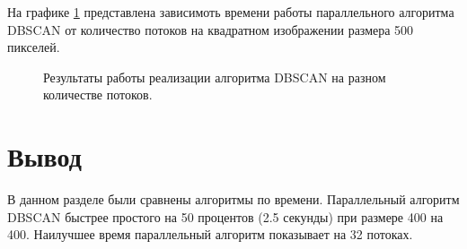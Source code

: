 На графике \ref{graph:j} представлена зависимоть времени работы параллельного алгоритма DBSCAN от количество потоков на квадратном изображении размера 500 пикселей.

\begin{figure}[ht!]
	\begin{center}
		\captionsetup{singlelinecheck = false, justification=centerfirst}
		\centering
		\caption{Результаты работы реализации алгоритма DBSCAN на разном количестве потоков.}
		\label{graph:j}
	\end{center}
	
\end{figure}

\newpage

\section*{Вывод}

В данном разделе были сравнены алгоритмы по времени.
Параллельный алгоритм DBSCAN быстрее простого на 50 процентов (2.5 секунды) при размере 400 на 400.
Наилучшее время параллельный алгоритм показывает на 32 потоках.  
 
